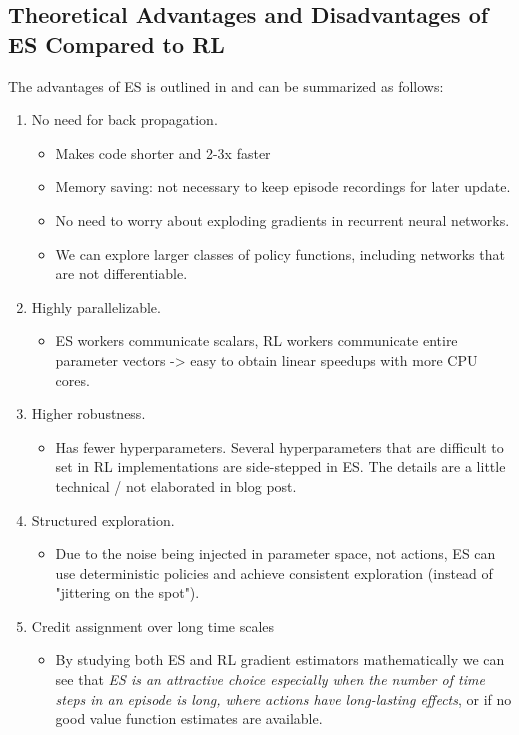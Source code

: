 \subsection{Theoretical Advantages and Disadvantages of ES Compared to RL}
The advantages of ES is outlined in \cite{Karpathy} and can be summarized as follows:
\begin{enumerate}
    \item No need for back propagation.
    \begin{itemize}
        \item Makes code shorter and 2-3x faster
        \item Memory saving: not necessary to keep episode recordings for later update.
        \item No need to worry about exploding gradients in recurrent neural networks.
        \item We can explore larger classes of policy functions, including networks that are not differentiable. 
    \end{itemize}
    \item Highly parallelizable.
    \begin{itemize}
        \item ES workers communicate scalars, RL workers communicate entire parameter vectors -> easy to obtain linear speedups with more CPU cores.
    \end{itemize}
    \item Higher robustness.
    \begin{itemize}
        \item Has fewer hyperparameters. Several hyperparameters that are difficult to set in RL implementations are side-stepped in ES. The details are a little technical / not elaborated in blog post.
    \end{itemize}

    \item Structured exploration.
    \begin{itemize}
        \item Due to the noise being injected in parameter space, not actions, ES can use deterministic policies and achieve consistent exploration (instead of "jittering on the spot"). 
    \end{itemize}
    \item Credit assignment over long time scales
    \begin{itemize}
        \item By studying both ES and RL gradient estimators mathematically we can see that \emph{ES is an attractive choice especially when the number of time steps in an episode is long, where actions have long-lasting effects}, or if no good value function estimates are available.
    \end{itemize}
\end{enumerate}

